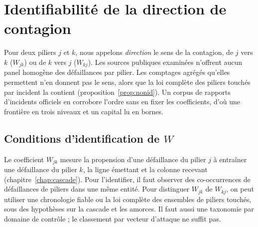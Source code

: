 
\chapter{Identifiabilité de la direction de contagion}
\label{ch:identifiabilite}

Pour deux piliers $j$ et $k$, nous appelons \emph{direction} le sens de la contagion, de $j$ vers $k$
($W_{jk}$) ou de $k$ vers $j$ ($W_{kj}$). Les sources publiques examinées n'offrent aucun panel homogène des défaillances par pilier. Les comptages agrégés qu'elles permettent n'en donnent pas le sens, alors que la loi
complète des piliers touchés par incident la contient (proposition~\ref{prop:nonid}). Un corpus de
rapports d'incidents officiels en corrobore l'ordre sans en fixer les coefficients, d'où une
frontière en trois niveaux et un capital lu en bornes.

\section{Conditions d'identification de $W$}

Le coefficient $W_{jk}$ mesure la propension d'une défaillance du pilier $j$ à entraîner une
défaillance du pilier $k$, la ligne émettant et la colonne recevant (chapitre~\ref{chap:cascade}).
Pour l'identifier, il faut observer des co-occurrences de défaillances de piliers dans une même
entité. Pour distinguer $W_{jk}$ de $W_{kj}$, on peut utiliser une chronologie fiable ou la loi complète des ensembles de piliers touchés,
sous des hypothèses sur la cascade et les amorces. Il faut aussi une taxonomie par domaine de contrôle ; le classement par vecteur d'attaque ne suffit pas.

